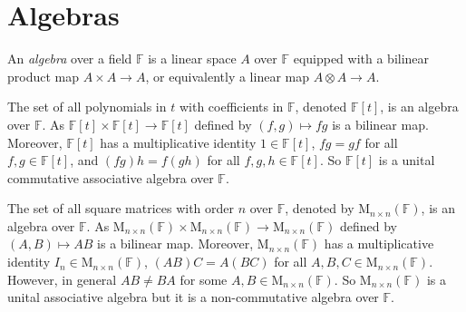 \documentclass[
	11pt, %
	fleqn, %
	a4paper, %
]{LegrandOrangeBook}
\newcommand{\F}{\mathbb{F}} %
\newcommand{\M}[2]{\text{M}_{#1}(#2)} %
\newcommand{\vequiv}{\rotatebox{90}{$\equiv$}}
\begin{document}
\begin{center}
    \qquad
\end{center}

\newpage

\section{Algebras}

\begin{definition}[Algebras]
    An \emph{algebra} over a field $\F$ is a linear space $A$ over $\F$ equipped with a bilinear product map $A \times A \to A$, or equivalently a linear map $A \otimes A \to A$.
\end{definition}

\begin{example}
    The set of all polynomials in $t$ with coefficients in $\F$, denoted $\F[t]$, is an algebra over $\F$. As $\F[t] \times \F[t] \to \F[t]$ defined by $(f, g) \mapsto fg$ is a bilinear map. Moreover, $\F[t]$ has a multiplicative identity $1 \in \F[t]$, $fg = gf$ for all $f, g \in \F[t]$, and $(fg)h = f(gh)$ for all $f, g, h \in \F[t]$. So $\F[t]$ is a unital commutative associative algebra over $\F$.
\end{example}

\begin{example}
    The set of all square matrices with order $n$ over $\F$, denoted by $\M{n \times n}{\F}$, is an algebra over $\F$. As $\M{n \times n}{\F} \times \M{n \times n}{\F} \to \M{n \times n}{\F}$ defined by $(A, B) \mapsto AB$ is a bilinear map. Moreover, $\M{n \times n}{\F}$ has a multiplicative identity $I_n \in \M{n \times n}{\F}$, $(AB)C = A(BC)$ for all $A, B, C \in \M{n \times n}{\F}$. However, in general $AB \neq BA$ for some $A, B \in \M{n \times n}{\F}$. So $\M{n \times n}{\F}$ is a unital associative algebra but it is a non-commutative algebra over $\F$.
\end{example}
\end{document}
